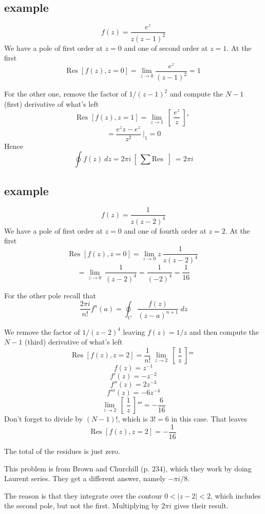 \documentclass[11pt, oneside]{article}
\begin{document}
\subsection*{example}
\[ f(z) = \frac{e^z}{z(z-1)^2} \]
We have a pole of first order at $z=0$ and one of second order at $z=1$.  At the first
\[ \text{Res } [f(z),z=0] = \lim_{z \rightarrow 0} \frac{e^z}{(z-1)^2} = 1 \]

For the other one, remove the factor of $1/(z-1)^2$ and compute the $N-1$ (first) derivative of what's left
\[ \text{Res } [f(z),z=1] = \lim_{z \rightarrow 1} \ [ \ \frac{e^z}{z} \ ]' \ \]
\[ = \frac{e^z z - e^z}{z^2} \ \bigg |_1 =  0 \]
Hence
\[ \oint f(z) \ dz = 2 \pi i \ [ \ \sum  \text{Res } \ ] \ = 2 \pi i \]

\subsection*{example}
\[ f(z) = \frac{1}{z(z-2)^4} \]
We have a pole of first order at $z=0$ and one of fourth order at $z=2$.  At the first
\[ \text{Res } [f(z),z=0] = \lim_{z \rightarrow 0}  z \ \frac{1}{z(z-2)^4} \]
\[ =  \lim_{z \rightarrow 0} \ \frac{1}{(z-2)^4}  = \frac{1}{(-2)^4} =  \frac{1}{16} \]

For the other pole recall that
\[ \frac{2 \pi i}{n!} f^n(a) = \oint_C \frac{f(z)}{(z-a)^{n+1}} \ dz \]

We remove the factor of $1/(z-2)^4$ leaving $f(z) = 1/z$ and then compute the $N-1$ (third) derivative of what's left
\[ \text{Res } [f(z),z=2] = \frac{1}{n!} \ \lim_{z \rightarrow 2} \ [ \ \frac{1}{z} \ ]''' \ \]
\[ f(z) = z^{-1} \]
\[ f'(z) = - z^{-2} \]
\[ f''(z) = 2 z^{-3} \]
\[ f'''(z) = -6 z^{-4} \]
\[  \lim_{z \rightarrow 2} \ [ \ \frac{1}{z} \ ]''' = - \frac{6}{16} \]
Don't forget to divide by $(N-1)!$, which is $3! = 6$ in this case.  That leaves
\[ \text{Res } [f(z),z=2] = - \frac{1}{16} \]

The total of the residues is just zero.  

This problem is from Brown and Churchill (p. 234), which they work by doing Laurent series.  They get a different answer, namely $-\pi i/8$.  

The reason is that they integrate over the contour $0 < | z - 2 | < 2$, which includes the second pole, but not the first.  Multiplying by $2 \pi i$ gives their result.
\end{document}
